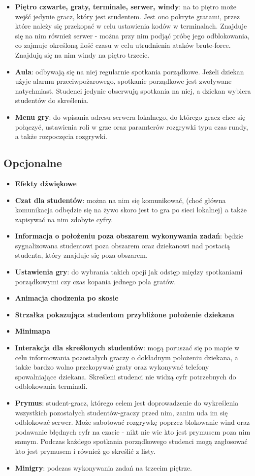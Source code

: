 \documentclass[]{report}
\begin{document}
\begin{itemize}
	\item \textbf{Piętro czwarte, graty, terminale, serwer, windy}: na to piętro może wejść jedynie gracz, który jest studentem. Jest ono pokryte gratami, przez które należy się przekopać w celu ustawienia kodów w terminalach. Znajduje się na nim również serwer - można przy nim podjąć próbę jego odblokowania, co zajmuje określoną ilość czasu w celu utrudnienia ataków brute-force. Znajdują się na nim windy na piętro trzecie.
	\item \textbf{Aula}: odbywają się na niej regularnie spotkania porządkowe. Jeżeli dziekan użyje alarmu przeciwpożarowego, spotkanie porządkowe jest zwoływane natychmiast. Studenci jedynie obserwują spotkania na niej, a dziekan wybiera studentów do skreślenia.
	\item \textbf{Menu gry}: do wpisania adresu serwera lokalnego, do którego gracz chce się połączyć, ustawienia roli w grze oraz paramterów rozgrywki typu czas rundy, a także rozpoczęcia rozgrywki.
\end{itemize}
\subsection{Opcjonalne}
\begin{itemize}
	\item \textbf{Efekty dźwiękowe}
	\item \textbf{Czat dla studentów}: można na nim się komunikować, (choć główna komunikacja odbędzie się na żywo skoro jest to gra po sieci lokalnej) a także zapisywać na nim zdobyte cyfry.
	\item \textbf{Informacja o położeniu poza obszarem wykonywania zadań}: będzie sygnalizowana studentowi poza obszarem oraz dziekanowi nad postacią studenta, który znajduje się poza obszarem.
	\item \textbf{Ustawienia gry}: do wybrania takich opcji jak odstęp między spotkaniami porządkowymi czy czas kopania jednego pola gratów.
	\item \textbf{Animacja chodzenia po skosie}
	\item \textbf{Strzałka pokazująca studentom przybliżone położenie dziekana}
	\item \textbf{Minimapa}
	\item \textbf{Interakcja dla skreślonych studentów}: mogą poruszać się po mapie w celu informowania pozostałych graczy o dokładnym położeniu dziekana, a także bardzo wolno przekopywać graty oraz wykonywać telefony spowalniające dziekana. Skreśleni studenci nie widzą cyfr potrzebnych do odblokowania terminali.
	\item \textbf{Prymus}: student-gracz, którego celem jest doprowadzenie do wykreślenia wszystkich pozostałych studentów-graczy przed nim, zanim uda im się odblokować serwer. Może sabotować rozgrywkę poprzez blokowanie wind oraz podawanie błędnych cyfr na czacie - nikt nie wie kto jest prymusem poza nim samym. Podczas każdego spotkania porządkowego studenci mogą zagłosować kto jest prymusem i również go skreślić z listy.
	\item \textbf{Minigry}: podczas wykonywania zadań na trzecim piętrze.
\end{itemize}
\end{document}
